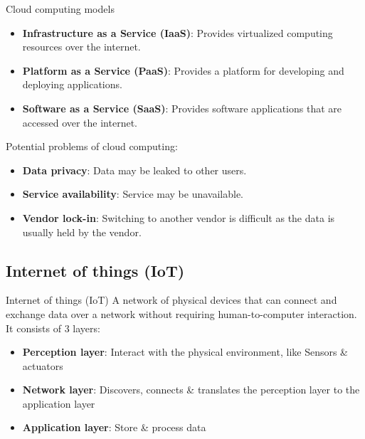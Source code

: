 \documentclass{article}
\begin{document}
\begin{theorem}
    {Cloud computing models}
    \begin{itemize}
        \item \textbf{Infrastructure as a Service (IaaS)}: Provides virtualized computing resources over the internet.
        \item \textbf{Platform as a Service (PaaS)}: Provides a platform for developing and deploying applications.
        \item \textbf{Software as a Service (SaaS)}: Provides software applications that are accessed over the internet.
    \end{itemize}
\end{theorem}

Potential problems of cloud computing:

\begin{itemize}
    \item \textbf{Data privacy}: Data may be leaked to other users.
    \item \textbf{Service availability}: Service may be unavailable.
    \item \textbf{Vendor lock-in}: Switching to another vendor is difficult as the data is usually held by the vendor.
\end{itemize}

\subsection{Internet of things (IoT)}
\begin{definition}
    {Internet of things (IoT)}
    A network of physical devices that can connect and exchange data over a network without requiring human-to-computer interaction. It consists of 3 layers:
    \begin{itemize}
        \item \textbf{Perception layer}: Interact with the physical environment, like Sensors \& actuators
        \item \textbf{Network layer}: Discovers, connects \& translates the perception layer to the application layer
        \item \textbf{Application layer}: Store \& process data
    \end{itemize}
\end{definition}
\end{document}
